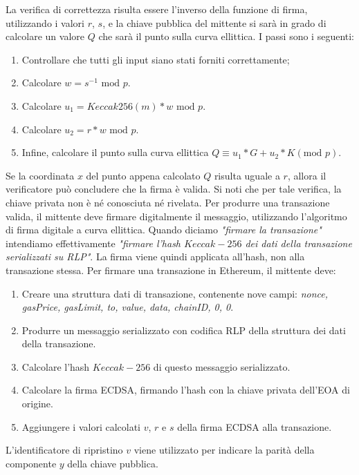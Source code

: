 %
La verifica di correttezza risulta essere l'inverso della funzione di firma, utilizzando i valori $r$, $s$, e la chiave pubblica del mittente si sarà in grado di calcolare un valore $Q$ che sarà il punto sulla curva ellittica. I passi sono i seguenti:
\begin{enumerate}
	\item Controllare che tutti gli input siano stati forniti correttamente;
	\item Calcolare $ w = s^{-1} \text{ mod }p $.
	\item Calcolare $ u_{1} = Keccak256( m ) * w \text{ mod } p $.
	\item Calcolare $ u_{2} = r * w \text{ mod } p $.
	\item Infine, calcolare il punto sulla curva ellittica $ Q \equiv u_{1} * G + u_{2} * K (\text{mod } p)$.
\end{enumerate}
Se la coordinata $x$ del punto appena calcolato $Q$ risulta uguale a $r$, allora il verificatore può concludere che la firma è valida. Si noti che per tale verifica, la chiave privata non è né conosciuta né rivelata.
Per produrre una transazione valida, il mittente deve firmare digitalmente il messaggio, utilizzando l'algoritmo di firma digitale a curva ellittica. Quando diciamo \textit{"firmare la transazione"} intendiamo effettivamente \textit{"firmare l'hash $Keccak-256$ dei dati della transazione serializzati su RLP"}. La firma viene quindi applicata all'hash, non alla transazione stessa. Per firmare  una transazione in Ethereum, il mittente deve:
\begin{enumerate}
	\item Creare una struttura dati di transazione, contenente nove campi: \textit{nonce, gasPrice, gasLimit, to, value, data, chainID, 0, 0}.
	\item Produrre un messaggio serializzato con codifica RLP della struttura dei dati della transazione.
	\item Calcolare l'hash $Keccak-256$ di questo messaggio serializzato.
	\item Calcolare la firma ECDSA, firmando l'hash con la chiave privata dell'EOA di origine.
	\item Aggiungere i valori calcolati $v$, $r$ e $s$ della firma ECDSA alla transazione.
\end{enumerate}
L'identificatore di ripristino $v$ viene utilizzato per indicare la parità della componente $y$ della chiave pubblica.
